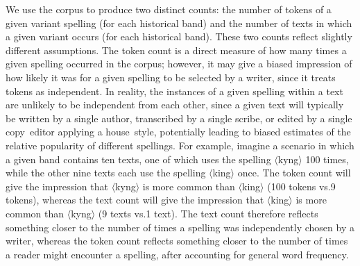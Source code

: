 \documentclass[doc,biblatex]{apa7}
\newcommand\spelling[1]{\allowbreak$\langle$#1$\rangle$}
\begin{document}
We use the corpus to produce two distinct counts: the number of tokens of a given variant spelling (for each historical band) and the number of texts in which a given variant occurs (for each historical band). These two counts reflect slightly different assumptions. The token count is a direct measure of how many times a given spelling occurred in the corpus; however, it may give a biased impression of how likely it was for a given spelling to be selected by a writer, since it treats tokens as independent. In reality, the instances of a given spelling within a text are unlikely to be independent from each other, since a given text will typically be written by a single author, transcribed by a single scribe, or edited by a single copy~editor applying a house~style, potentially leading to biased estimates of the relative popularity of different spellings. For example, imagine a scenario in which a given band contains ten texts, one of which uses the spelling \spelling{kyng} 100 times, while the other nine texts each use the spelling \spelling{king} once. The token count will give the impression that \spelling{kyng} is more common than \spelling{king} (100 tokens vs.\@ 9 tokens), whereas the text count will give the impression that \spelling{king} is more common than \spelling{kyng} (9 texts vs.\@ 1 text). The text count therefore reflects something closer to the number of times a spelling was independently chosen by a writer, whereas the token count reflects something closer to the number of times a reader might encounter a spelling, after accounting for general word frequency.
\end{document}
